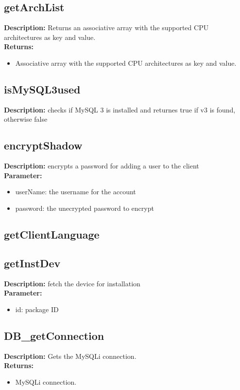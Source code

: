 \subsection{getArchList}
\textbf{Description:} Returns an associative array with the supported CPU architectures as key and value.\\
\textbf{Returns:}
\begin{itemize}
\item Associative array with the supported CPU architectures as key and value.
\end{itemize}

\subsection{isMySQL3used}
\textbf{Description:} checks if MySQL 3 is installed and returnes true if v3 is found, otherwise false\\

\subsection{encryptShadow}
\textbf{Description:} encrypts a password for adding a user to the client\\
\textbf{Parameter:}
\begin{itemize}
\item userName: the username for the account
\item password: the unecrypted password to encrypt
\end{itemize}

\subsection{getClientLanguage}

\subsection{getInstDev}
\textbf{Description:} fetch the device for installation\\
\textbf{Parameter:}
\begin{itemize}
\item id: package ID
\end{itemize}

\subsection{DB\_getConnection}
\textbf{Description:} Gets the MySQLi connection.\\
\textbf{Returns:}
\begin{itemize}
\item MySQLi connection.
\end{itemize}

